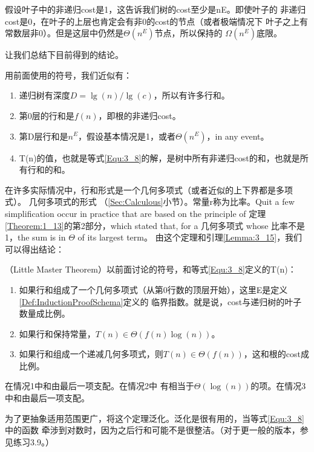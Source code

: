 假设叶子中的非递归cost是1，这告诉我们树的cost至少是nE。即使叶子的
非递归cost是0，在叶子的上层也肯定会有非0的cost的节点（或者极端情况下
叶子之上有常数层非0）。但是这层中仍然是$\Theta(n^E)$节点，所以保持的
$\Omega(n^E)$底限。

让我们总结下目前得到的结论。
\begin{lemma}\label{Lemma:3_15}
用前面使用的符号，我们近似有：

\begin{enumerate}
\item 递归树有深度$D=\lg(n)/\lg(c)$，所以有许多行和。
\item 第0层的行和是$f(n)$，即根的非递归cost。
\item 第D层行和是$n^E$，假设基本情况是1，或者$\Theta(n^E)$，in any event。
\item T(n)的值，也就是等式\ref{Equ:3_8}的解，是树中所有非递归cost的和，也就是所有行和的和。
\end{enumerate}
\end{lemma}

在许多实际情况中，行和形式是一个几何多项式（或者近似的上下界都是多项式）。
几何多项式的形式 （\ref{Sec:Calculous}小节）。常量r称为比率。Quit a few simplification occur
in practice that are based on the principle of 定理\ref{Theorem:1_13}的第2部分，which stated
that, for a 几何多项式 whose 比率不是1，the sum is in $\Theta$ of its largest term。
由这个定理和引理\ref{Lemma:3_15}，我们可以得出结论：

\begin{theorem}\label{Theorem:LittleMasterTheorem}
（Little Master Theorem）以前面讨论的符号，和等式\ref{Equ:3_8}定义的T(n)：

\begin{enumerate}
\item 如果行和组成了一个几何多项式（从第0行数的顶层开始），这里E是定义\ref{Def:InductionProofSchema}定义的
    临界指数。就是说，cost与递归树的叶子数量成比例。
\item 如果行和保持常量，$T(n)\in \Theta(f(n)\log(n))$。
\item 如果行和组成一个递减几何多项式，则$T(n)\in \Theta(f(n))$，这和根的cost成比例。
\end{enumerate}

 在情况1中和由最后一项支配。在情况2中
有相当于$\Theta(\log(n))$的项。在情况3中和由最后一项支配。
\end{theorem}

为了更抽象适用范围更广，将这个定理泛化。泛化是很有用的，当等式\ref{Equ:3_8}中的函数
牵涉到对数时，因为之后行和可能不是很整洁。（对于更一般的版本，参见练习3.9。）


